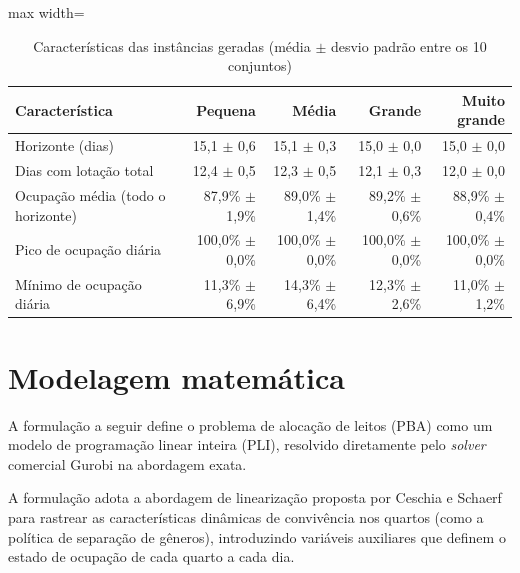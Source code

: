 \begin{table}[H]
    \caption[Características das instâncias geradas]{Características das instâncias geradas (média $\pm$ desvio padrão entre os 10 conjuntos)}
    \label{tab:caracteristicas-instancias}
    \centering
    \begin{adjustbox}{max width=\textwidth}
    \begin{tabular}{lrrrr}
        \hline
        \textbf{Característica} & \textbf{Pequena} & \textbf{Média} & \textbf{Grande} & \textbf{Muito grande} \\
        \hline
        Horizonte (dias) & 15,1 $\pm$ 0,6 & 15,1 $\pm$ 0,3 & 15,0 $\pm$ 0,0 & 15,0 $\pm$ 0,0 \\
        Dias com lotação total & 12,4 $\pm$ 0,5 & 12,3 $\pm$ 0,5 & 12,1 $\pm$ 0,3 & 12,0 $\pm$ 0,0 \\
        Ocupação média (todo o horizonte) & 87,9\% $\pm$ 1,9\% & 89,0\% $\pm$ 1,4\% & 89,2\% $\pm$ 0,6\% & 88,9\% $\pm$ 0,4\% \\
        Pico de ocupação diária & 100,0\% $\pm$ 0,0\% & 100,0\% $\pm$ 0,0\% & 100,0\% $\pm$ 0,0\% & 100,0\% $\pm$ 0,0\% \\
        Mínimo de ocupação diária & 11,3\% $\pm$ 6,9\% & 14,3\% $\pm$ 6,4\% & 12,3\% $\pm$ 2,6\% & 11,0\% $\pm$ 1,2\% \\
        \hline
    \end{tabular}
    \end{adjustbox}
\end{table}


\section{Modelagem matemática}
\label{sec:modelagem-matematica}

A formulação a seguir define o problema de alocação de leitos (PBA) como um modelo de programação linear inteira (PLI), resolvido diretamente pelo \textit{solver} comercial Gurobi na abordagem exata.

A formulação adota a abordagem de linearização proposta por Ceschia e Schaerf \cite{ceschia2011local} para rastrear as características dinâmicas de convivência nos quartos (como a política de separação de gêneros), introduzindo variáveis auxiliares que definem o estado de ocupação de cada quarto a cada dia.


